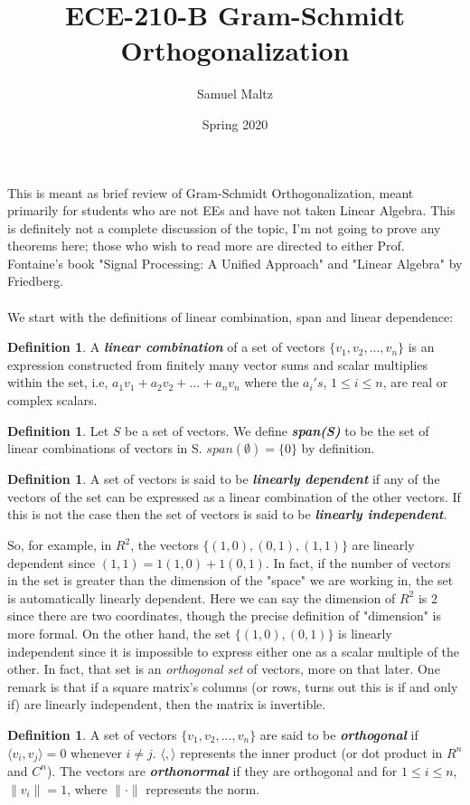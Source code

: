 \documentclass[11pt,a4paper]{report}
\title{ECE-210-B Gram-Schmidt Orthogonalization}
\author{Samuel Maltz}
\date{Spring 2020}
\theoremstyle{plain}
\theoremstyle{definition}
\newtheorem{defn}[thm]{Definition}
\begin{document}
This is meant as brief review of Gram-Schmidt Orthogonalization, meant primarily for students who are not EEs and have not taken Linear Algebra. This is definitely not a complete discussion of the topic, I'm not going to prove any theorems here; those who wish to read more are directed to either Prof. Fontaine's book "Signal Processing: A Unified Approach" and "Linear Algebra" by Friedberg. \\ \\
We start with the definitions of linear combination, span and linear dependence:
\begin{defn} A \textbf{\textit{linear combination}} of a set of vectors $\{v_1, v_2,...,v_n\}$ is an expression constructed from finitely many vector sums and scalar multiplies within the set, i.e, $a_1v_1 + a_2v_2 + ... + a_nv_n$ where the $a_i's$, $1 \leq i \leq n$, are real or complex scalars.
\end{defn}

\begin{defn}
Let $S$ be a set of vectors. We define \textbf{\textit{span(S)}} to be the set of linear combinations of vectors in S. $span(\emptyset) = \{0\}$ by definition.
\end{defn}

\begin{defn} A set of vectors is said to be \textbf{\textit{linearly dependent}} if any of the vectors of the set can be expressed as a linear combination of the other vectors. If this is not the case then the set of vectors is said to be \textbf{\textit{linearly independent}}.
\end{defn}

So, for example, in $R^2$, the vectors $\{(1,0),(0,1),(1,1)\}$ are linearly dependent since $(1,1) = 1(1,0) + 1(0,1)$. In fact, if the number of vectors in the set is greater than the dimension of the "space" we are working in, the set is automatically linearly dependent. Here we can say the dimension of $R^2$ is 2 since there are two coordinates, though the precise definition of "dimension" is more formal. On the other hand, the set $\{(1,0),(0,1)\}$ is linearly independent since it is impossible to express either one as a scalar multiple of the other. In fact, that set is an \textit{orthogonal set} of vectors, more on that later. One remark is that if a square matrix's columns (or rows, turns out this is if and only if) are linearly independent, then the matrix is invertible.

\begin{defn} A set of vectors $\{v_1, v_2,...,v_n\}$ are said to be \textbf{\textit{orthogonal}} if $\langle v_i,v_j \rangle  = 0$ whenever $i \neq j$. $\langle , \rangle$ represents the inner product (or dot product in $R^n$ and $C^n$). The vectors are \textbf{\textit{orthonormal}} if they are orthogonal and for $1 \leq i \leq n$, $\|v_i\| = 1$, where $\|\cdot\|$ represents the norm.
\end{defn}
\end{document}
